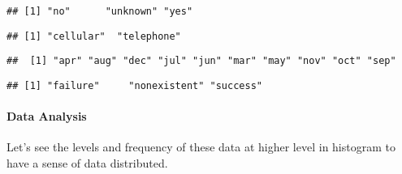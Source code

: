 \documentclass[
]{article}
\newenvironment{Shaded}{\begin{snugshade}}{\end{snugshade}}
\newcommand{\KeywordTok}[1]{\textcolor[rgb]{0.13,0.29,0.53}{\textbf{#1}}}
\newcommand{\NormalTok}[1]{#1}
\newcommand{\OperatorTok}[1]{\textcolor[rgb]{0.81,0.36,0.00}{\textbf{#1}}}
\begin{document}
\begin{Shaded}
\end{Shaded}

\begin{verbatim}
## [1] "no"      "unknown" "yes"
\end{verbatim}

\begin{Shaded}
\end{Shaded}

\begin{verbatim}
## [1] "cellular"  "telephone"
\end{verbatim}

\begin{Shaded}
\end{Shaded}

\begin{verbatim}
##  [1] "apr" "aug" "dec" "jul" "jun" "mar" "may" "nov" "oct" "sep"
\end{verbatim}

\begin{Shaded}
\end{Shaded}

\begin{verbatim}
## [1] "failure"     "nonexistent" "success"
\end{verbatim}

\hypertarget{data-analysis}{%
\paragraph{Data Analysis}\label{data-analysis}}

Let's see the levels and frequency of these data at higher level in
histogram to have a sense of data distributed.
\end{document}

